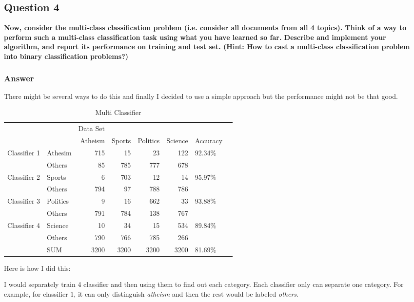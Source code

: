 \documentclass{article}
\begin{document}
\subsection{Question 4}
\label{sec-1-4}

\textbf{Now, consider the multi-class classification problem (i.e. consider all documents from all 4 topics). Think of a way to perform such a multi-class classification task using what you have learned so far. Describe and implement your algorithm, and report its performance on training and test set. (Hint: How to cast a multi-class classification problem into binary classification problems?)}

\subsubsection{Answer}
\label{sec-1-4-1}

There might be several ways to do this and finally I decided to use a simple approach but the performance might not be that good.

\begin{table}[htb]
\caption{\label{tab:multi-cls}Multi Classifier}
\centering
\begin{tabular}{ll|rrrr|ll}
 &  & Data Set &  &  &  &  & \\
 &  & Atheism & Sports & Politics & Science & Accuracy & \\
\hline
Classifier 1 & Athesim & 715 & 15 & 23 & 122 & 92.34\% & \\
 & Others & 85 & 785 & 777 & 678 &  & \\
Classifier 2 & Sports & 6 & 703 & 12 & 14 & 95.97\% & \\
 & Others & 794 & 97 & 788 & 786 &  & \\
Classifier 3 & Politics & 9 & 16 & 662 & 33 & 93.88\% & \\
 & Others & 791 & 784 & 138 & 767 &  & \\
Classifier 4 & Science & 10 & 34 & 15 & 534 & 89.84\% & \\
 & Others & 790 & 766 & 785 & 266 &  & \\
\hline
 & SUM & 3200 & 3200 & 3200 & 3200 & 81.69\% & \\
\end{tabular}
\end{table}


Here is how I did this:

I would separately train 4 classifier and then using them to find out each category. Each classifier only can separate one category. For example, for classifier 1, it can only distinguish \emph{atheism} and then the rest would be labeled \emph{others}. 
\end{document}
